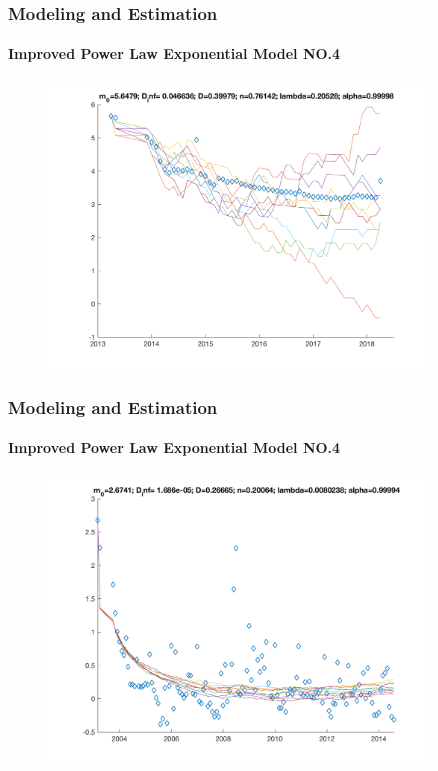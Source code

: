 \documentclass[11pt]{beamer}
\begin{document}
\begin{frame}
	\frametitle{Modeling and Estimation}
	\framesubtitle{Improved Power Law Exponential Model NO.4}
	\justifying
	\begin{figure}
		\begin{center}
			\includegraphics[width=0.9\textwidth  ]{BBplot_87} 
		\end{center}
	\end{figure}				
\end{frame}	


\begin{frame}
	\frametitle{Modeling and Estimation}
	\framesubtitle{Improved Power Law Exponential Model NO.4}
	\justifying
	\begin{figure}
		\begin{center}
			\includegraphics[width=0.9\textwidth  ]{BBplot_641} 
		\end{center}
	\end{figure}				
\end{frame}	
\end{document}
